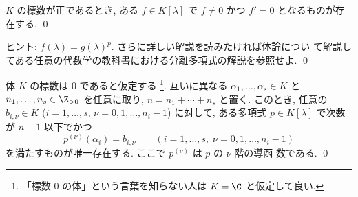 \documentclass[12pt,twoside]{jarticle}
\begin{document}

\begin{question}
  $K$ の標数が正であるとき, ある $f\in K[\lambda]$ で $f\ne 0$ かつ $f'=0$ 
  となるものが存在する. \qed
\end{question}

\noindent
ヒント: $f(\lambda)=g(\lambda)^p$.  さらに詳しい解説を読みたければ体論につい
て解説してある任意の代数学の教科書における分離多項式の解説を参照せよ.
\qed


%
%


\begin{question}
\label{q:Lagrange-interpolation-4}
  体 $K$ の標数は $0$ であると仮定する%
  \footnote{「標数 $0$ の体」という言葉を知らない人は $K=\C$ と仮定して良い.}.
  互いに異なる $\alpha_1,\dots,\alpha_s\in K$ 
  と $n_1,\dots,n_s\in\Z_{>0}$ を任意に取り, $n=n_1+\cdots+n_s$ と置く.
  このとき, 任意の  $b_{i,\nu}\in K$  ($i=1,\dots,s$, $\nu=0,1,\dots,n_i-1$) 
  に対して, ある多項式 $p\in K[\lambda]$ で次数が $n-1$ 以下でかつ
  \begin{equation*}
    p^{(\nu)}(\alpha_i) = b_{i,\nu}
    \qquad (i=1,\dots,s,\; \nu=0,1,\dots,n_i-1)
  \end{equation*}
  を満たすものが唯一存在する.   ここで $p^{(\nu)}$ は $p$ の $\nu$ 階の導函
  数である.  \qed
\end{question}
\end{document}
